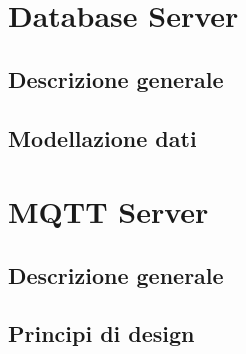 \section{Database Server}
\subsection{Descrizione generale}
\kant[5]
\subsection{Modellazione dati}
\kant[5]

\section{MQTT Server}
\subsection{Descrizione generale}
\kant[5]
\subsection{Principi di design}
\kant[5]


